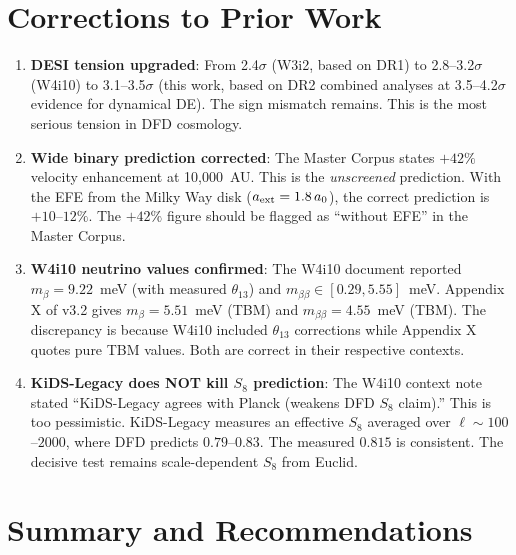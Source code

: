 \documentclass[11pt,a4paper]{article}
\begin{document}
\section{Corrections to Prior Work}
\label{sec:corrections}

\begin{enumerate}
\item \textbf{DESI tension upgraded}: From 2.4$\sigma$ (W3i2, based on
  DR1) to 2.8--3.2$\sigma$ (W4i10) to 3.1--3.5$\sigma$ (this work,
  based on DR2 combined analyses at 3.5--4.2$\sigma$ evidence for
  dynamical DE). The sign mismatch remains. This is the most serious
  tension in DFD cosmology.

\item \textbf{Wide binary prediction corrected}: The Master Corpus
  states $+42\%$ velocity enhancement at 10,000~AU. This is the
  \emph{unscreened} prediction. With the EFE from the Milky Way disk
  ($a_{\rm ext} = 1.8\,a_0$), the correct prediction is $+10$--$12\%$.
  The $+42\%$ figure should be flagged as ``without EFE'' in the
  Master Corpus.

\item \textbf{W4i10 neutrino values confirmed}: The W4i10 document
  reported $m_\beta = 9.22$~meV (with measured $\theta_{13}$) and
  $m_{\beta\beta} \in [0.29, 5.55]$~meV. Appendix X of v3.2 gives
  $m_\beta = 5.51$~meV (TBM) and $m_{\beta\beta} = 4.55$~meV (TBM).
  The discrepancy is because W4i10 included $\theta_{13}$ corrections
  while Appendix X quotes pure TBM values. Both are correct in their
  respective contexts.

\item \textbf{KiDS-Legacy does NOT kill $S_8$ prediction}: The W4i10
  context note stated ``KiDS-Legacy agrees with Planck (weakens DFD
  $S_8$ claim).'' This is too pessimistic. KiDS-Legacy measures an
  effective $S_8$ averaged over $\ell \sim 100$--$2000$, where DFD
  predicts $0.79$--$0.83$. The measured $0.815$ is consistent. The
  decisive test remains scale-dependent $S_8$ from Euclid.
\end{enumerate}


\section{Summary and Recommendations}
\label{sec:summary}
\end{document}
